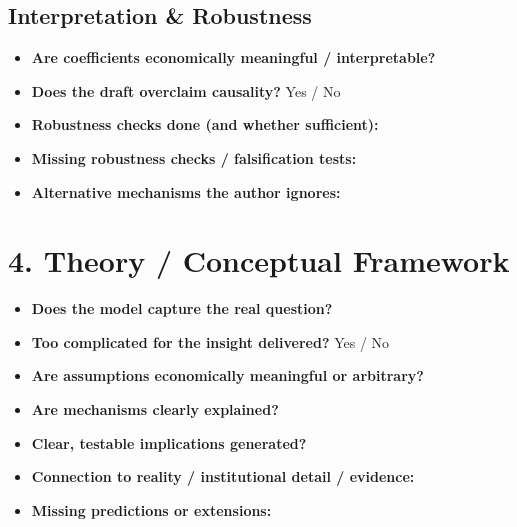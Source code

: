 \documentclass[11pt, letterpaper]{article}
\begin{document}
\subsection{Interpretation \& Robustness}
\begin{itemize}[leftmargin=*, nosep]
  \item \textbf{Are coefficients economically meaningful / interpretable?}
  \vspace{1.5cm}
  \item \textbf{Does the draft overclaim causality?} \quad Yes \quad / \quad No
  \vspace{0.5cm}
  \item \textbf{Robustness checks done (and whether sufficient):}
  \vspace{1.5cm}
  \item \textbf{Missing robustness checks / falsification tests:}
  \vspace{1.5cm}
  \item \textbf{Alternative mechanisms the author ignores:}
  \vspace{1.5cm}
\end{itemize}

\section{4. Theory / Conceptual Framework}

\begin{itemize}[leftmargin=*, nosep]
  \item \textbf{Does the model capture the real question?}
  \vspace{1.5cm}
  \item \textbf{Too complicated for the insight delivered?} \quad Yes \quad / \quad No
  \vspace{0.5cm}
  \item \textbf{Are assumptions economically meaningful or arbitrary?}
  \vspace{1.5cm}
  \item \textbf{Are mechanisms clearly explained?}
  \vspace{1.5cm}
  \item \textbf{Clear, testable implications generated?}
  \vspace{1.5cm}
  \item \textbf{Connection to reality / institutional detail / evidence:}
  \vspace{1.5cm}
  \item \textbf{Missing predictions or extensions:}
  \vspace{1.5cm}
\end{itemize}
\end{document}
